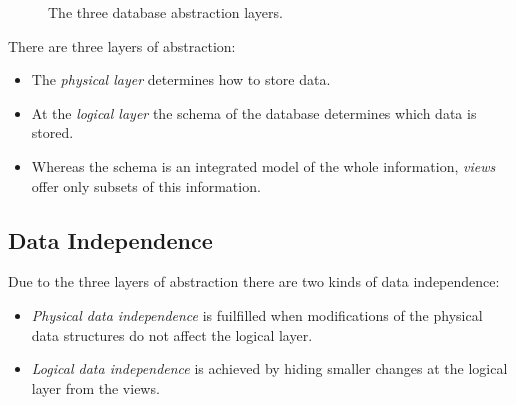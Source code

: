 \begin{figure}[htbp]
\begin{center}
\end{center}
\caption[Database Abstraction Layers]{The three database abstraction layers.}
\end{figure}

There are three layers of abstraction:
\begin{itemize}
\item The \emph{physical layer} determines how to store data.
\item At the \emph{logical layer} the schema of the database determines which data is stored.
\item Whereas the schema is an integrated model of the whole information, \emph{views} offer only subsets of this information.
\end{itemize}




\subsection{Data Independence}

Due to the three layers of abstraction there are two kinds of data independence:

\begin{itemize}
\item \emph{Physical data independence} is fuilfilled when modifications of the physical data structures do not affect the logical layer.
\item \emph{Logical data independence} is achieved by hiding smaller changes at the logical layer from the views.
\end{itemize}

